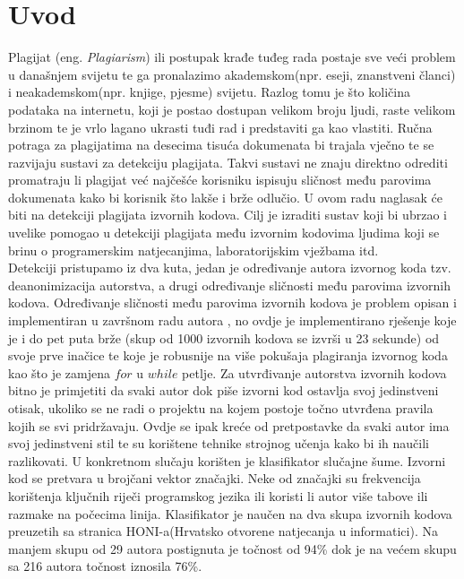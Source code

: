 \chapter*{Uvod}

	Plagijat (eng. \textit{Plagiarism}) ili postupak krađe tuđeg rada postaje sve veći problem u današnjem svijetu te ga pronalazimo akademskom(npr. eseji, znanstveni članci) i neakademskom(npr. knjige, pjesme) svijetu. Razlog tomu je što količina podataka na internetu, koji je postao dostupan velikom broju ljudi, raste velikom brzinom te je vrlo lagano ukrasti tuđi rad i predstaviti ga kao vlastiti. Ručna potraga za plagijatima na desecima tisuća dokumenata bi trajala vječno te se razvijaju sustavi za detekciju plagijata. Takvi sustavi ne znaju direktno odrediti promatraju li plagijat već najčešće korisniku ispisuju sličnost među parovima dokumenata kako bi korisnik što lakše i brže odlučio. U ovom radu naglasak će biti na detekciji plagijata izvornih kodova. Cilj je izraditi sustav koji bi ubrzao i uvelike pomogao u detekciji plagijata među izvornim kodovima ljudima koji se brinu o programerskim natjecanjima, laboratorijskim vježbama itd. \\

	Detekciji pristupamo iz dva kuta, jedan je određivanje autora izvornog koda tzv. deanonimizacija autorstva, a drugi određivanje sličnosti među parovima izvornih kodova. Određivanje sličnosti među parovima izvornih kodova je problem opisan i implementiran u završnom radu autora \cite{plagijator}, no ovdje je implementirano rješenje koje je i do pet puta brže (skup od 1000 izvornih kodova se izvrši u 23 sekunde) od svoje prve inačice te koje je robusnije na više pokušaja plagiranja izvornog koda kao što je zamjena $for$ u $while$ petlje. Za utvrđivanje autorstva izvornih kodova bitno je primjetiti da svaki autor dok piše izvorni kod ostavlja svoj jedinstveni otisak, ukoliko se ne radi o projektu na kojem postoje točno utvrđena pravila kojih se svi pridržavaju. Ovdje se ipak kreće od pretpostavke da svaki autor ima svoj jedinstveni stil te su korištene tehnike strojnog učenja kako bi ih naučili razlikovati. U konkretnom slučaju korišten je klasifikator slučajne šume. Izvorni kod se pretvara u brojčani vektor značajki. Neke od značajki su frekvencija korištenja ključnih riječi programskog jezika ili koristi li autor više tabove ili razmake na počecima linija. Klasifikator je naučen na dva skupa izvornih kodova preuzetih sa stranica HONI-a(Hrvatsko otvorene natjecanja u informatici). Na manjem skupu od 29 autora postignuta je točnost od 94\% dok je na većem skupu sa 216 autora točnost iznosila 76\%.

